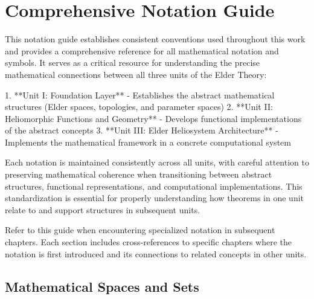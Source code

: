 \chapter*{Comprehensive Notation Guide}
\label{chap:notation_guide}

This notation guide establishes consistent conventions used throughout this work and provides a comprehensive reference for all mathematical notation and symbols. It serves as a critical resource for understanding the precise mathematical connections between all three units of the Elder Theory: 

1. **Unit I: Foundation Layer** - Establishes the abstract mathematical structures (Elder spaces, topologies, and parameter spaces)
2. **Unit II: Heliomorphic Functions and Geometry** - Develops functional implementations of the abstract concepts
3. **Unit III: Elder Heliosystem Architecture** - Implements the mathematical framework in a concrete computational system

Each notation is maintained consistently across all units, with careful attention to preserving mathematical coherence when transitioning between abstract structures, functional representations, and computational implementations. This standardization is essential for properly understanding how theorems in one unit relate to and support structures in subsequent units.

Refer to this guide when encountering specialized notation in subsequent chapters. Each section includes cross-references to specific chapters where the notation is first introduced and its connections to related concepts in other units.

\section*{Mathematical Spaces and Sets}

